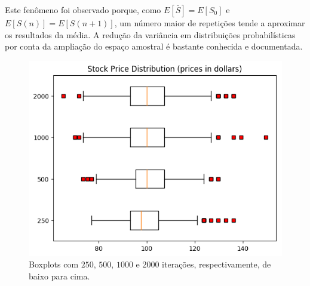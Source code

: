 \documentclass{article}
\begin{document}
Este fenômeno foi observado porque, como $E[\bar{S}] = E[S_{0}]$ e $E[S(n)] = E[S(n+1)]$, um número maior de repetições tende a aproximar os resultados da média.
A redução da variância em distribuições probabilísticas por conta da ampliação do espaço amostral é bastante conhecida e documentada. 

\begin{figure}[H]
	\includegraphics[width=\linewidth]{fig3_250.png}
	\centering
	
	\caption{Boxplots com $250$, $500$, $1000$ e $2000$ iterações, respectivamente, de baixo para cima.}
	\label{}
\end{figure}
\end{document}
